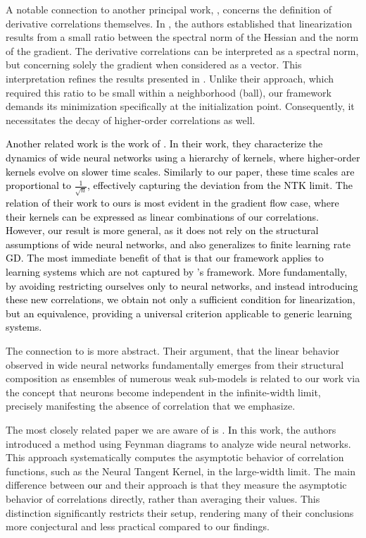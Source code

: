 \documentclass{article} %
\begin{document}
A notable connection to another principal work, \cite{OnTheLin2020}, concerns the definition of derivative correlations themselves. In \cite{OnTheLin2020}, the authors established that linearization results from a small ratio between the spectral norm of the Hessian and the norm of the gradient. The derivative correlations can be interpreted as a spectral norm, but concerning solely the gradient when considered as a vector. This interpretation refines the results presented in \cite{OnTheLin2020}. Unlike their approach, which required this ratio to be small within a neighborhood (ball), our framework demands its minimization specifically at the initialization point. Consequently, it necessitates the decay of higher-order correlations as well.

\textcolor{black}{Another related work is the work of \citet{huang2020dynamics}. In their work, they characterize the dynamics of wide neural networks using a hierarchy of kernels, where higher-order kernels evolve on slower time scales. Similarly to our paper, these time scales are proportional to $\frac{1}{\sqrt{n}}$, effectively capturing the deviation from the NTK limit. The relation of their work to ours is most evident in the gradient flow case, where their kernels can be expressed as linear combinations of our correlations. However, our result is more general, as it does not rely on the structural assumptions of wide neural networks, and also generalizes to finite learning rate GD. The most immediate benefit of that is that our framework applies to learning systems which are not captured by  \citet{huang2020dynamics}'s framework. More fundamentally, by avoiding restricting ourselves only to neural networks, and instead introducing these new correlations, we obtain not only a sufficient condition for linearization, but an equivalence, providing a universal criterion applicable to generic learning systems.}

The connection to \cite{Transition2022Liu} is more abstract. Their argument, that the linear behavior observed in wide neural networks fundamentally emerges from their structural composition as ensembles of numerous weak sub-models is related to our work via the concept that neurons become independent in the infinite-width limit, precisely manifesting the absence of correlation that we emphasize.

The most closely related paper we are aware of is \cite{AsymptoticsFeynmanDiagrams2019}. \textcolor{black}{In} this work, the authors introduced a method using Feynman diagrams to analyze wide neural networks. This approach systematically computes the asymptotic behavior of correlation functions, such as the Neural Tangent Kernel, in the large-width limit. The main difference between \textcolor{black}{our} and their approach is that they measure the asymptotic behavior of correlations directly, rather than averaging their values. This distinction significantly restricts their setup, rendering many of their conclusions more conjectural and less practical compared to our findings.
\end{document}
